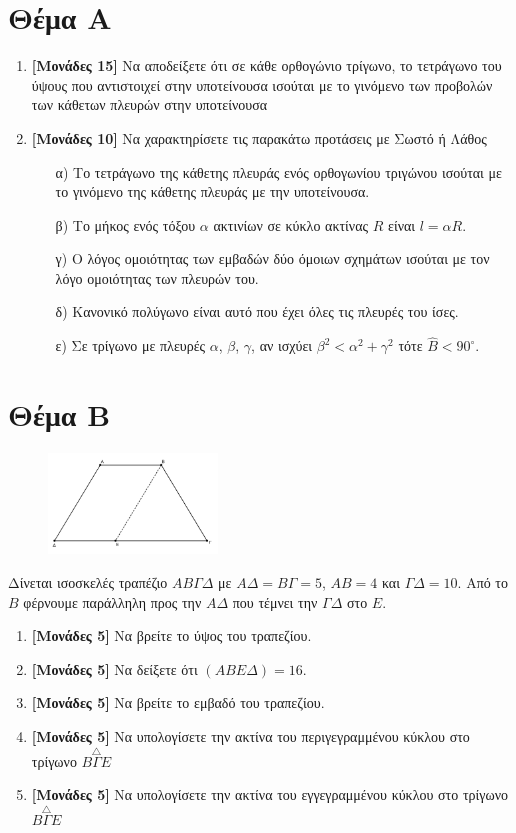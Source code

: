 \documentclass[12pt]{article}
\begin{document}
\section*{Θέμα Α}
  \noindent
  \begin{enumerate}
    \item \textbf{[Μονάδες 15]} Να αποδείξετε ότι σε κάθε ορθογώνιο τρίγωνο, το τετράγωνο του ύψους που αντιστοιχεί στην υποτείνουσα ισούται με το γινόμενο των προβολών των κάθετων πλευρών στην υποτείνουσα
    \item \textbf{[Μονάδες 10]}  Να χαρακτηρίσετε τις παρακάτω προτάσεις με Σωστό ή Λάθος
    \begin{enumerate}
      \item [α)] Το τετράγωνο της κάθετης πλευράς ενός ορθογωνίου τριγώνου ισούται με το γινόμενο της κάθετης πλευράς με την υποτείνουσα.
      \item [β)] Το μήκος ενός τόξου $α$ ακτινίων σε κύκλο ακτίνας $R$ είναι $l=αR$.
      \item [γ)] Ο λόγος ομοιότητας των εμβαδών δύο όμοιων σχημάτων ισούται με τον λόγο ομοιότητας των πλευρών του.
      \item [δ)] Κανονικό πολύγωνο είναι αυτό που έχει όλες τις πλευρές του ίσες.
      \item [ε)] Σε τρίγωνο με πλευρές $α$, $β$, $γ$, αν ισχύει $β^2<α^2+γ^2$ τότε $\hat{Β}<90^{\circ}$.
    \end{enumerate}
  \end{enumerate}

\section*{Θέμα Β}
  \noindent
  \begin{figure}
    \centering
    \vspace{-20pt}
    \includegraphics[width=0.4\textwidth]{2017BGeo2}
  \end{figure}
  Δίνεται ισοσκελές τραπέζιο $ΑΒΓΔ$ με $ΑΔ=ΒΓ=5$, $ΑΒ=4$ και $ΓΔ=10$. Από το $Β$ φέρνουμε παράλληλη προς την $ΑΔ$ που τέμνει την $ΓΔ$ στο $Ε$.
  \begin{enumerate}
    \item \textbf{[Μονάδες 5]}  Να βρείτε το ύψος του τραπεζίου.
    \item \textbf{[Μονάδες 5]}  Να δείξετε ότι $(ΑΒΕΔ)=16$.
    \item \textbf{[Μονάδες 5]}  Να βρείτε το εμβαδό του τραπεζίου.
    \item \textbf{[Μονάδες 5]}  Να υπολογίσετε την ακτίνα του περιγεγραμμένου κύκλου στο τρίγωνο $\overset{\triangle}{ΒΓΕ}$
    \item \textbf{[Μονάδες 5]}  Να υπολογίσετε την ακτίνα του εγγεγραμμένου κύκλου στο τρίγωνο $\overset{\triangle}{ΒΓΕ}$
  \end{enumerate}
\end{document}
